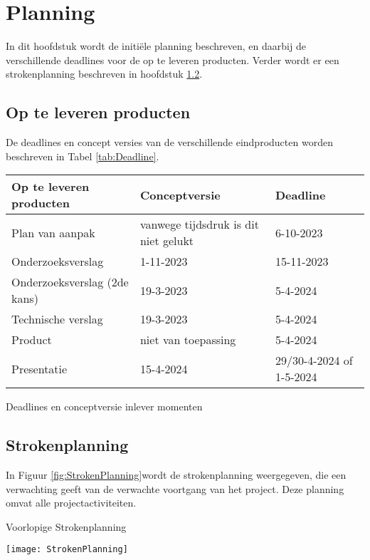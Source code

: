 \chapter{Planning}
In dit hoofdstuk wordt de initiële planning beschreven, en daarbij de verschillende deadlines voor de op te leveren producten.
Verder wordt er een strokenplanning beschreven in hoofdstuk \ref{sec:strokenplanning}.
\section{Op te leveren producten}
De deadlines en concept versies van de verschillende eindproducten worden beschreven in Tabel \ref{tab:Deadline}.

\whitespace[2]
\begin{graphic}
	\captionsetup{type=table}
	\begin{tabularx}{\textwidth}{|l|l|X|}
		\hline
		\textbf{Op te leveren producten} & \textbf{Conceptversie}               & \textbf{Deadline}         \\
		\hline
		Plan van aanpak                  & vanwege tijdsdruk is dit niet gelukt & 6-10-2023                 \\
		\hline
		Onderzoeksverslag                & 1-11-2023                            & 15-11-2023                \\
		\hline
		Onderzoeksverslag (2de kans)     & 19-3-2023                            & 5-4-2024                  \\
		\hline
		Technische verslag                & 19-3-2023                            & 5-4-2024                  \\
		\hline
		Product                          & niet van toepassing                  & 5-4-2024                  \\
		\hline
		Presentatie                      & 15-4-2024                            & 29/30-4-2024 of 1-5-2024 \\
		\hline
	\end{tabularx}
	\caption{Deadlines en conceptversie inlever momenten}
	\label{tab:Deadline}
    \vspace{0.2cm}
\end{graphic}
\section{Strokenplanning}
\label{sec:strokenplanning}
In Figuur \ref{fig:StrokenPlanning}wordt de strokenplanning weergegeven, die een verwachting geeft van de verwachte voortgang van het project.
Deze planning omvat alle projectactiviteiten.

\whitespace[2]
\begin{graphic}
	\captionsetup{type=figure}
	\caption{Voorlopige Strokenplanning}
	\texttt{[image: StrokenPlanning]}
	\label{fig:StrokenPlanning}
\end{graphic}
